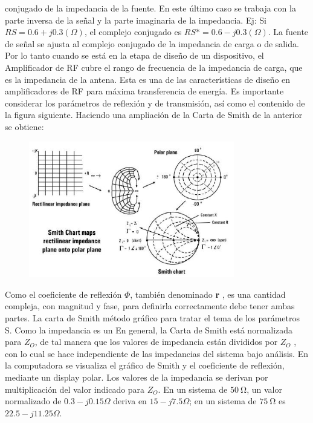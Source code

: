 \documentclass[a4paper,12pt,twoside]{article}
\begin{document}
conjugado de la impedancia de la fuente.
En este último caso se trabaja con la parte inversa de la señal y la parte imaginaria de la
impedancia. Ej: Si $RS = 0.6 + j0.3 (\Omega)$, el complejo conjugado es $RS*= 0.6-j0.3 (\Omega)$. La fuente de
señal se ajusta al complejo conjugado de la impedancia de carga o de salida.
Por lo tanto cuando se está en la etapa de diseño de un dispositivo, el Amplificador de RF
cubre el rango de frecuencia de la impedancia de carga, que es la impedancia de la antena.
Esta es una de las características de diseño en amplificadores de RF para máxima
transferencia de energía. Es importante considerar los parámetros de reflexión y de
transmisión, así como el contenido de
la figura siguiente.
Haciendo una ampliación de la Carta de Smith de la anterior se obtiene:
\begin{figure}[H]
    \centering
    \includegraphics[width=0.8\textwidth]{../img/smith2.png}
\end{figure}

Como el coeficiente de reflexión $\Phi$, también denominado \textbf{r} , es una cantidad compleja, con magnitud y fase, para definirla correctamente debe tener ambas partes. La carta de Smith
método gráfico para tratar el tema de los parámetros S. Como la impedancia es un
En general, la Carta de Smith está normalizada para $Z_O$, de tal manera que los valores de
impedancia están divididos por $Z_O$ , con lo cual se hace independiente de las impedancias
del sistema bajo análisis.
En la computadora se visualiza el gráfico de Smith y el coeficiente de reflexión, mediante un
display polar.
Los valores de la impedancia se derivan por multiplicación del valor indicado para $Z_O$. En un
sistema de $\SI{50}\ohm$, un valor normalizado de $0.3 - j0.15 \Omega$  deriva en $15 - j7.5 \Omega$; en un
sistema de $\SI{75}\ohm$  es $22.5 - j 11.25 \Omega$.
\end{document}
